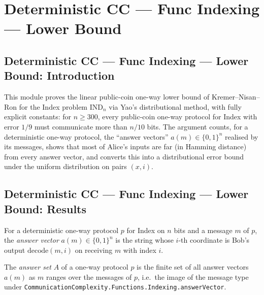 \section{Deterministic CC --- Func Indexing --- Lower Bound}
\subsection*{Deterministic CC --- Func Indexing --- Lower Bound: Introduction}

This module proves the linear public-coin one-way lower bound of Kremer--Nisan--Ron for the
Index problem $\mathrm{IND}_n$ via Yao's distributional method, with fully explicit constants:
for $n \ge 300$, every public-coin one-way protocol for Index with error $1/9$ must
communicate more than $n/10$ bits.  The argument counts, for a deterministic one-way protocol,
the ``answer vectors'' $a(m) \in \{0,1\}^n$ realised by its messages, shows that most of
Alice's inputs are far (in Hamming distance) from every answer vector, and converts this into
a distributional error bound under the uniform distribution on pairs $(x,i)$.

\subsection*{Deterministic CC --- Func Indexing --- Lower Bound: Results}

\begin{definition}
\label{CommunicationComplexity.Functions.Indexing.answerVector}
\leanok
{}
For a deterministic one-way protocol $p$ for Index on $n$ bits and a message $m$ of $p$, the
\emph{answer vector} $a(m) \in \{0,1\}^n$ is the string whose $i$-th coordinate is Bob's output
$\mathrm{decode}(m, i)$ on receiving $m$ with index $i$.
\end{definition}

\begin{definition}
\label{CommunicationComplexity.Functions.Indexing.answerSet}
\leanok
{}
The \emph{answer set} $A$ of a one-way protocol $p$ is the finite set of all answer vectors
$a(m)$ as $m$ ranges over the messages of $p$, i.e.\ the image of the message type under
\texttt{CommunicationComplexity.Functions.Indexing.answerVector}.
\end{definition}

